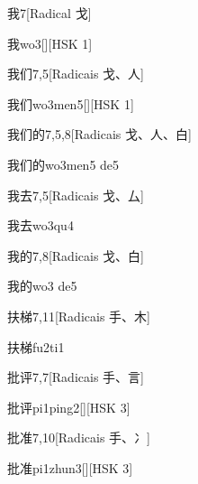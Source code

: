 \begin{entry}{我}{7}[Radical ⼽]
  \begin{phonetics}{我}{wo3}[][HSK 1]
  \end{phonetics}
\end{entry}

\begin{entry}{我们}{7,5}[Radicais ⼽、⼈]
  \begin{phonetics}{我们}{wo3men5}[][HSK 1]
  \end{phonetics}
\end{entry}

\begin{entry}{我们的}{7,5,8}[Radicais ⼽、⼈、⽩]
  \begin{phonetics}{我们的}{wo3men5 de5}
  \end{phonetics}
\end{entry}

\begin{entry}{我去}{7,5}[Radicais ⼽、⼛]
  \begin{phonetics}{我去}{wo3qu4}
  \end{phonetics}
\end{entry}

\begin{entry}{我的}{7,8}[Radicais ⼽、⽩]
  \begin{phonetics}{我的}{wo3 de5}
  \end{phonetics}
\end{entry}

\begin{entry}{扶梯}{7,11}[Radicais ⼿、⽊]
  \begin{phonetics}{扶梯}{fu2ti1}
  \end{phonetics}
\end{entry}

\begin{entry}{批评}{7,7}[Radicais ⼿、⾔]
  \begin{phonetics}{批评}{pi1ping2}[][HSK 3]
  \end{phonetics}
\end{entry}

\begin{entry}{批准}{7,10}[Radicais ⼿、⼎]
  \begin{phonetics}{批准}{pi1zhun3}[][HSK 3]
  \end{phonetics}
\end{entry}

